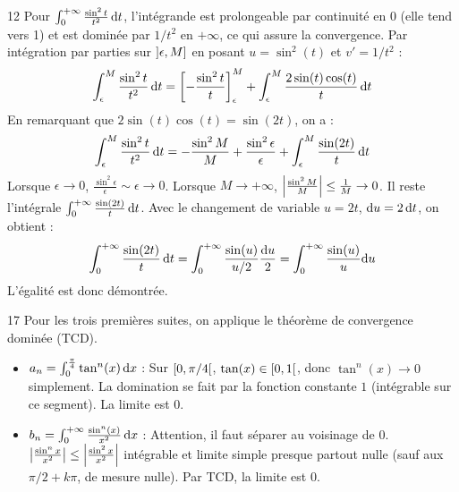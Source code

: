 \begin{correction}{12}
Pour $\int_{0}^{+\infty}\frac{\sin^{2}t}{t^{2}}\,\mathrm{d}t$, l'intégrande est prolongeable par continuité en 0 (elle tend vers 1) et est dominée par $1/t^2$ en $+\infty$, ce qui assure la convergence.
Par intégration par parties sur $\left]\epsilon, M\right]$ en posant $u = \sin^2(t)$ et $v' = 1/t^2$ :
$$ \int_{\epsilon}^{M} \frac{\sin^{2}t}{t^{2}}\,\mathrm{d}t = \left[ -\frac{\sin^{2}t}{t} \right]_{\epsilon}^{M} + \int_{\epsilon}^{M} \frac{2\sin(t)\cos(t)}{t}\,\mathrm{d}t $$
En remarquant que $2\sin(t)\cos(t) = \sin(2t)$, on a :
$$ \int_{\epsilon}^{M} \frac{\sin^{2}t}{t^{2}}\,\mathrm{d}t = -\frac{\sin^{2}M}{M} + \frac{\sin^{2}\epsilon}{\epsilon} + \int_{\epsilon}^{M} \frac{\sin(2t)}{t}\,\mathrm{d}t $$
Lorsque $\epsilon \to 0$, $\frac{\sin^{2}\epsilon}{\epsilon} \sim \epsilon \to 0$.
Lorsque $M \to +\infty$, $\left|\frac{\sin^{2}M}{M}\right| \le \frac{1}{M} \to 0$.
Il reste l'intégrale $\int_{0}^{+\infty}\frac{\sin(2t)}{t}\,\mathrm{d}t$. Avec le changement de variable $u=2t$, $\mathrm{d}u = 2\,\mathrm{d}t$, on obtient :
$$ \int_{0}^{+\infty}\frac{\sin(2t)}{t}\,\mathrm{d}t = \int_{0}^{+\infty}\frac{\sin(u)}{u/2}\frac{\mathrm{d}u}{2} = \int_{0}^{+\infty}\frac{\sin(u)}{u}\mathrm{d}u $$
L'égalité est donc démontrée.
\end{correction}

\begin{correction}{17}
Pour les trois premières suites, on applique le théorème de convergence dominée (TCD).
\begin{itemize}
    \item $a_{n}=\int_{0}^{\frac{\pi}{4}}\tan^{n}(x)\,\mathrm{d}x$ :
    Sur $\left[0, \pi/4\right[$, $\tan(x) \in \left[0, 1\right[$, donc $\tan^n(x) \to 0$ simplement. La domination se fait par la fonction constante $1$ (intégrable sur ce segment). La limite est $0$.
    \item $b_{n}=\int_{0}^{+\infty}\frac{\sin^{n}(x)}{x^{2}}\,\mathrm{d}x$ :
    Attention, il faut séparer au voisinage de 0. $\left|\frac{\sin^n x}{x^2}\right| \le \left|\frac{\sin^2 x}{x^2}\right|$ intégrable et limite simple presque partout nulle (sauf aux $\pi/2 + k\pi$, de mesure nulle). Par TCD, la limite est 0.
\end{itemize}
\end{correction}

